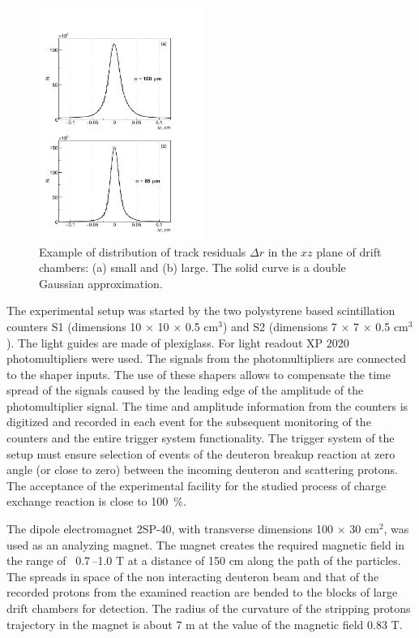 \documentclass[twocolumn,epjc3]{svjour3}
\begin{document}
\begin{figure}[ht]
  \centering
  \includegraphics[width=0.48\textwidth]{res_chambers.pdf}
  \caption{Example of distribution of track residuals $\Delta r$ in the $xz$
    plane of drift chambers: (a) small and (b) large. The solid curve is a
    double Gaussian approximation.}
  \label{fig:res_chambers}
\end{figure}

The experimental setup was started by the two polysty\-rene based scintillation
counters S1 (dimensions 10 $\times$ 10 $\times$ 0.5 cm$^3$) and S2 (dimensions 7
$\times$ 7 $\times$ 0.5 cm$^3$). The light guides are made of plexiglass. For
light readout XP 2020 photomultipliers were used. The signals from the
photomultipliers are connected to the shaper inputs. The use of these shapers
allows to compensate the time spread of the signals caused by the leading edge
of the amplitude of the photomultiplier signal. The time and amplitude
information from the counters is digitized and recorded in each event for the
subsequent monitoring of the counters and the entire trigger system
functionality. The trigger system of the setup must ensure selection of events
of the deuteron breakup reaction at zero angle (or close to zero) between the
incoming deuteron and scattering protons. The acceptance of the experimental
facility for the studied process of charge exchange reaction is close to 100~\%.

The dipole electromagnet 2SP-40, with transverse dimensions 100 $\times$ 30
cm$^2$, was used as an analyzing magnet. The magnet creates the required
magnetic field in the range of \ 0.7\,--1.0 T at a distance of 150 cm along the
path of the particles. The spreads in space of the non interacting deuteron beam
and that of the recorded protons from the examined reaction are bended to the
blocks of large drift chambers for detection. The radius of the curvature of the
stripping protons trajectory in the magnet is about 7 m at the value of the
magnetic field 0.83 T.
\end{document}
